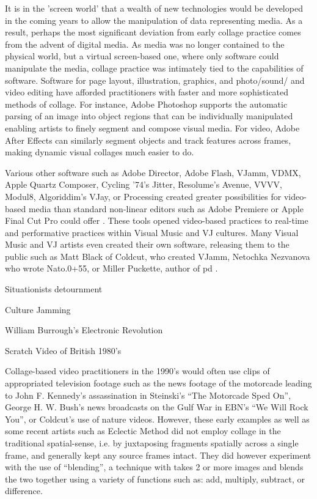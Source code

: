 \documentclass[a4paper,10pt,final]{ThesisStyle}
\begin{document}
It is in the 'screen world' that a wealth of new technologies would be developed in the coming years to allow the manipulation of data representing media.  As a result, perhaps the most significant deviation from early collage practice comes from the advent of digital media.  As media was no longer contained to the physical world, but a virtual screen-based one, where only software could manipulate the media, collage practice was intimately tied to the capabilities of software.  Software for page layout, illustration, graphics, and photo/sound/ and video editing have afforded practitioners with faster and more sophisticated methods of collage.  For instance, Adobe Photoshop supports the automatic parsing of an image into object regions that can be individually manipulated enabling artists to finely segment and compose visual media.  For video, Adobe After Effects can similarly segment objects and track features across frames, making dynamic visual collages much easier to do.  

Various other software such as Adobe Director, Adobe Flash, VJamm, VDMX, Apple Quartz Composer, Cycling '74's Jitter, Resolume's Avenue, VVVV, Modul8, Algoriddim's VJay, or Processing created greater possibilities for video-based media than standard non-linear editors such as Adobe Premiere or Apple Final Cut Pro could offer \cite{Jaeger2006}.  These tools opened video-based practices to real-time and performative practices within Visual Music and VJ cultures.  Many Visual Music and VJ artists even created their own software, releasing them to the public such as Matt Black of Coldcut, who created VJamm, Netochka Nezvanova who wrote Nato.0+55, or Miller Puckette, author of pd \cite{Jaeger2006}.  %

Situationists detournment

Culture Jamming

William Burrough's Electronic Revolution

Scratch Video of British 1980's 

Collage-based video practitioners in the 1990's would often use clips of appropriated television footage such as the news footage of the motorcade leading to John F. Kennedy's assassination in Steinski's ``The Motorcade Sped On'', George H. W. Bush's news broadcasts on the Gulf War in EBN's ``We Will Rock You'', or Coldcut's use of nature videos.  However, these early examples as well as some recent artists such as Eclectic Method did not employ collage in the traditional spatial-sense, i.e. by juxtaposing fragments spatially across a single frame, and generally kept any source frames intact.  They did however experiment with the use of ``blending'', a technique with takes 2 or more images and blends the two together using a variety of functions such as: add, multiply, subtract, or difference.  
\end{document}
